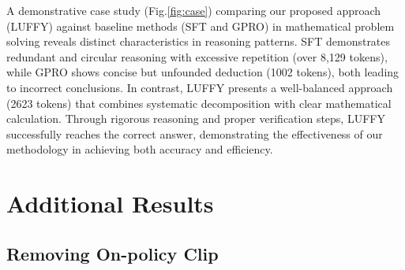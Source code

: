 A demonstrative case study (Fig.\ref{fig:case}) comparing our proposed approach (LUFFY) against baseline methods (SFT and GPRO) in mathematical problem solving reveals distinct characteristics in reasoning patterns. SFT demonstrates redundant and circular reasoning with excessive repetition (over 8,129 tokens), while GPRO shows concise but unfounded deduction (1002 tokens), both leading to incorrect conclusions. In contrast, LUFFY presents a well-balanced approach (2623 tokens) that combines systematic decomposition with clear mathematical calculation. Through rigorous reasoning and proper verification steps, LUFFY successfully reaches the correct answer, demonstrating the effectiveness of our methodology in achieving both accuracy and efficiency.


\section{Additional Results}



\subsection{Removing On-policy Clip}


